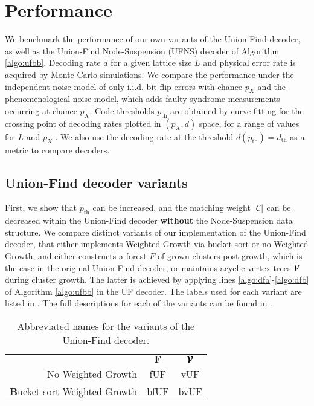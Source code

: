 \section{Performance}\label{sec:performance}

We benchmark the performance of our own variants of the Union-Find decoder, as well as the Union-Find Node-Suspension (UFNS) decoder of Algorithm \ref{algo:ufbb}. Decoding rate $d$ for a given lattice size $L$ and physical error rate is acquired by Monte Carlo simulations. We compare the performance under the independent noise model of only i.i.d. bit-flip errors with chance $p_X$ and the phenomenological noise model, which adds faulty syndrome measurements occurring at chance $p_X$. Code thresholds $p_{\text{th}}$ are obtained by curve fitting for the crossing point of decoding rates plotted in $(p_X, d)$ space, for a range of values for $L$ and $p_X$ \cite{wang2003confinement}. We also use the decoding rate at the threshold $d(p_{\text{th}})= d_{\text{th}}$ as a metric to compare decoders. 

\subsection{Union-Find decoder variants}

First, we show that $p_{\text{th}}$ can be increased, and the matching weight $\lvert\mathcal{C}\rvert$ can be decreased within the Union-Find decoder \textbf{without} the Node-Suspension data structure. We compare distinct variants of our implementation of the Union-Find decoder, that either implements Weighted Growth via bucket sort or no Weighted Growth, and either constructs a forest $F$ of grown clusters post-growth, which is the case in the original Union-Find decoder, or maintains acyclic vertex-trees $\mathcal{V}$ during cluster growth. The latter is achieved by applying lines \ref{algo:dfa}-\ref{algo:dfb} of Algorithm \ref{algo:ufbb} in the UF decoder. The labels used for each variant are listed in . The full descriptions for each of the variants can be found in \cite{markthesis}.

\begin{table}[htbp]
  \centering
  \begin{tabularx}{\linewidth} { | R{2} || C{.5} | C{.5} | }
    \hline
    & $\mathbf{F}$ &  $\pmb{\mathcal{V}}$\\
    \hhline{|=::=:=|}
    No Weighted Growth & fUF  & vUF \\
    \hline
    \textbf{B}ucket sort Weighted Growth & bfUF & bvUF \\
    \hline
  \end{tabularx}
  \caption{Abbreviated names for the variants of the Union-Find decoder.}\label{tab:uftable}
\end{table}


